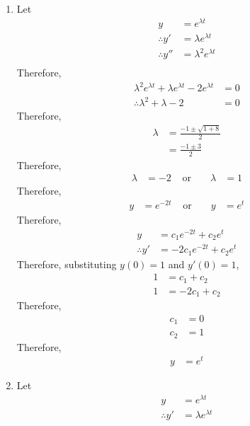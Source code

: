 \documentclass[fleqn, a4paper, 11pt, oneside]{amsart}
\theoremstyle{definition}
\theoremstyle{theorem}
\begin{document}
\begin{solution}
	\begin{enumerate}[leftmargin = *]
		\item
			Let
			\begin{align*}
				y              & = e^{\lambda t}           \\
				\therefore y'  & = \lambda e^{\lambda t}   \\
				\therefore y'' & = \lambda^2 e^{\lambda t} \\
			\end{align*}
			Therefore,
			\begin{align*}
				\lambda^2 e^{\lambda t} + \lambda e^{\lambda t} - 2 e^{\lambda t} & = 0 \\
				\therefore \lambda^2 + \lambda - 2                                & = 0
			\end{align*}
			Therefore,
			\begin{align*}
				\lambda & = \frac{-1 \pm \sqrt{1 + 8}}{2} \\
                                        & = \frac{-1 \pm 3}{2}
			\end{align*}
			Therefore,
			\begin{align*}
				\lambda & = -2 & \text{ or } &  & \lambda & = 1
			\end{align*}
			Therefore,
			\begin{align*}
				y & = e^{-2 t} & \text{ or } &  & y & = e^t
			\end{align*}
			Therefore,
			\begin{align*}
				y &= c_1 e^{-2 t} + c_2 e^t\\
				\therefore y' &= -2 c_1 e^{-2 t} + c_2 e^t
			\end{align*}
			Therefore, substituting $y(0) = 1$ and $y'(0) = 1$,
			\begin{align*}
				1 &= c_1 + c_2\\
				1 &= -2 c_1 + c_2
			\end{align*}
			Therefore,
			\begin{align*}
				c_1 &= 0\\
				c_2 &= 1
			\end{align*}
			Therefore,
			\begin{align*}
				y &= e^t
			\end{align*}
		\item
			Let
			\begin{align*}
				y              & = e^{\lambda t}           \\
				\therefore y'  & = \lambda e^{\lambda t}   \\

\end{align*}
\end{enumerate}
\end{solution}
\end{document}
